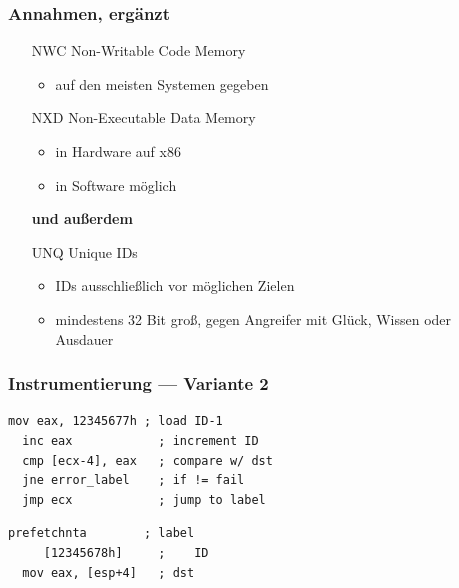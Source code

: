 \documentclass[mathserif,slidestop,compress,red]{beamer}
\begin{document}
\begin{frame}
  \frametitle{Annahmen, ergänzt}
  \begin{itemize}
    \item[NWC] Non-Writable Code Memory
    \begin{itemize}
      \item auf den meisten Systemen gegeben
    \end{itemize}
    \item[NXD] Non-Executable Data Memory
    \begin{itemize}
      \item in Hardware auf x86
      \item in Software möglich
    \end{itemize}
    \begin{flushleft}
      \textbf{und außerdem}
    \end{flushleft}
    \item[UNQ] Unique IDs
    \begin{itemize}
      \item IDs ausschließlich vor möglichen Zielen
      \item mindestens 32 Bit groß, gegen Angreifer mit Glück, Wissen oder Ausdauer
    \end{itemize}
  \end{itemize}
\end{frame}

\begin{frame}[fragile]
  \frametitle{Instrumentierung — Variante 2}
  \begin{lstlisting}[title=Quelle]
  mov eax, 12345677h ; load ID-1
  inc eax            ; increment ID
  cmp [ecx-4], eax   ; compare w/ dst
  jne error_label    ; if != fail
  jmp ecx            ; jump to label
  \end{lstlisting}
  \begin{lstlisting}[title=Ziel]
  prefetchnta        ; label
     [12345678h]     ;    ID
  mov eax, [esp+4]   ; dst
  \end{lstlisting}
\end{frame}
\end{document}
